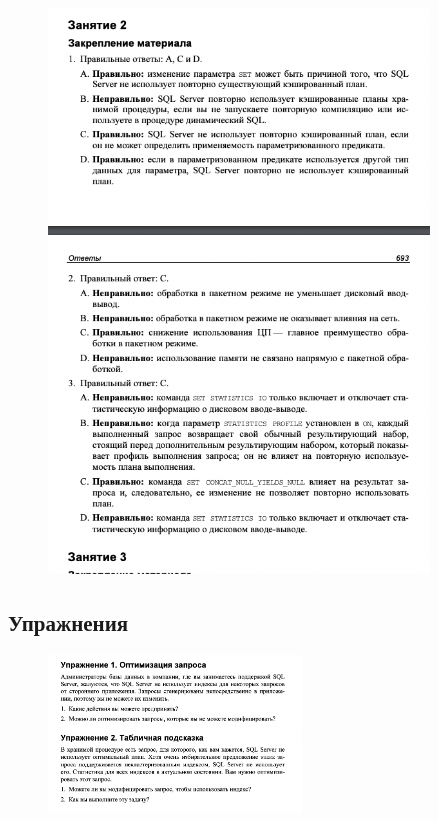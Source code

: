 \begin{figure}[h!]
	\begin{center}
		\includegraphics[width=0.9\textwidth]{img/ans49.png}
	\end{center}
	\captionsetup{justification=centering}
\end{figure}


\newpage
\subsection*{Упражнения}

\begin{figure}[h!]
	\begin{center}
		\includegraphics[width=0.6\textwidth]{img/ex50.png}
	\end{center}
	\captionsetup{justification=centering}
\end{figure}

